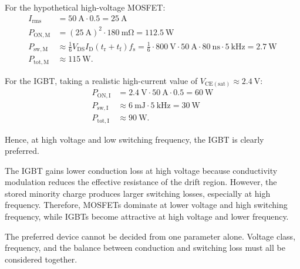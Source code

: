 \begin{solutionblock}
    For the hypothetical high-voltage MOSFET:
    \begin{align}
        I_\mathrm{rms} &= \SI{50}{\ampere} \cdot 0.5 = \SI{25}{\ampere} \\
        P_\mathrm{ON,M} &= \left( \SI{25}{\ampere} \right)^2 \cdot \SI{180}{\milli\ohm} = \SI{112.5}{\watt}  \\
        P_\mathrm{sw,M} &\approx \frac{1}{6} V_\mathrm{DS} I_\mathrm{D} (t_\mathrm{r} + t_\mathrm{f}) f_\mathrm{s} =
                        \frac{1}{6} \cdot \SI{800}{\volt} \cdot \SI{50}{\ampere} \cdot \SI{80}{\nano\second} \cdot \SI{5}{\kilo\hertz} = \SI{2.7}{\watt} \\
        P_\mathrm{tot,M} &\approx \SI{115}{\watt}.
    \end{align}

    For the IGBT, taking a realistic high-current value of $V_\mathrm{CE(sat)} \approx \SI{2.4}{\volt}$:
    \begin{align}
        P_\mathrm{ON,I} &= \SI{2.4}{\volt} \cdot \SI{50}{\ampere} \cdot 0.5 = \SI{60}{\watt} \\
        P_\mathrm{sw,I} &\approx \SI{6}{\milli\joule} \cdot \SI{5}{\kilo\hertz} = \SI{30}{\watt} \\
        P_\mathrm{tot,I} &\approx \SI{90}{\watt}.
    \end{align}

    Hence, at high voltage and low switching frequency, the IGBT is clearly preferred.
\end{solutionblock}


\begin{solutionblock}
    The IGBT gains lower conduction loss at high voltage because conductivity modulation reduces the effective resistance of the drift region.
    However, the stored minority charge produces larger switching losses, especially at high frequency.
    Therefore, MOSFETs dominate at lower voltage and high switching frequency, while IGBTs become attractive at high voltage and lower frequency.
\end{solutionblock}


\begin{solutionblock}
    The preferred device cannot be decided from one parameter alone. 
    Voltage class, frequency, and the balance between conduction and switching loss must all be considered together.
\end{solutionblock}


